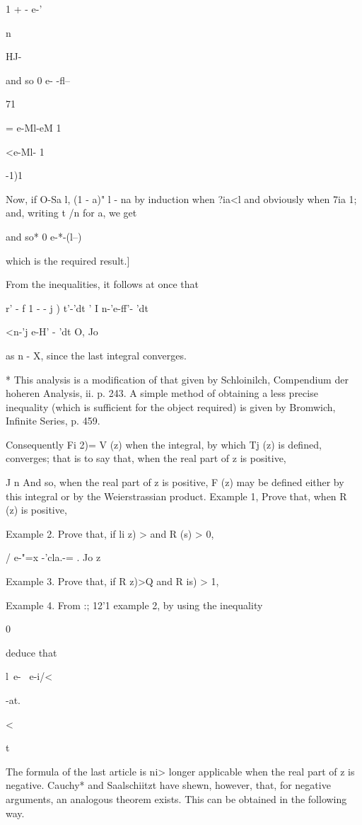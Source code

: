 1 + - e-'

n

HJ-

and so 0 e- -fl--

71

= e-Ml-eM 1

<e-Ml- 1

-1)1

Now, if O-Sa l, (1 - a)" l - na by induction when ?ia<l and obviously
when 7ia 1; and, writing t /n for a, we get

and so* 0 e-*-(l--) %

which is the required result.]

From the inequalities, it follows at once that

r' - f 1 - - j ) t'-'dt ' I n-'e-ff'- 'dt

<n-'j e-H' - 'dt O, Jo

as n - X, since the last integral converges.

* This analysis is a modification of that given by Schloinilch,
Compendium der hoheren Analysis, ii. p. 243. A simple method of
obtaining a less precise inequality (which is sufficient for the
object required) is given by Bromwich, Infinite Series, p. 459.

%
%

Consequently Fi 2)= V (z) when the integral, by which Tj (z) is
defined, converges; that is to say that, when the real part of z is
positive,

J n And so, when the real part of z is positive, F (z) may be defined
either by this integral or by the Weierstrassian product. Example 1,
Prove that, when R (z) is positive,

Example 2. Prove that, if li z) > and R (s) > 0,

/ e-"=x -'cla.-= . Jo z

Example 3. Prove that, if R z)>Q and R is) > 1,

Example 4. From :; 12'1 example 2, by using the inequality

0%

deduce that

l\ e- \ e-i/<

-at.

<

t


The formula of the last article is ni> longer applicable when the real
part of z is negative. Cauchy* and Saalschiitzt have shewn, however,
that, for negative arguments, an analogous theorem exists. This can be
obtained in the following way.

